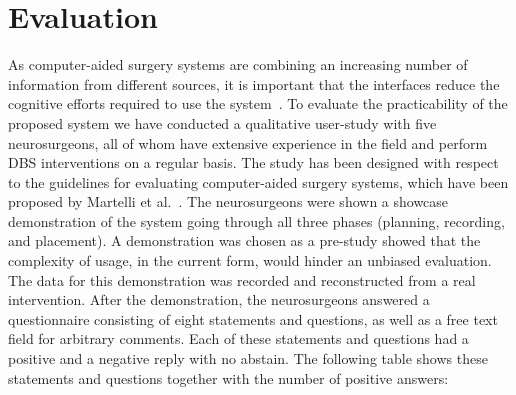\documentclass[review]{vgtc}                 %
\begin{document}


\section{Evaluation}\label{sec:evaluation}
As computer-aided surgery systems are combining an increasing number of information from different sources, it is important that the interfaces reduce the cognitive efforts required to use the system~\cite{Visarius1997,Martelli2003}. To evaluate the practicability of the proposed system we have conducted a qualitative user-study with five neurosurgeons, all of whom have extensive experience in the field and perform DBS interventions on a regular basis. The study has been designed with respect to the guidelines for evaluating computer-aided surgery systems, which have been proposed by Martelli et al.~\cite{Martelli2003}. The neurosurgeons were shown a showcase demonstration of the system going through all three phases (planning, recording, and placement). A demonstration was chosen as a pre-study showed that the complexity of usage, in the current form, would hinder an unbiased evaluation. The data for this demonstration was recorded and reconstructed from a real intervention. After the demonstration, the neurosurgeons answered a questionnaire consisting of eight statements and questions, as well as a free text field for arbitrary comments. Each of these statements and questions had a positive and a negative reply with no abstain. The following table shows these statements and questions together with the number of positive answers:

\end{document}
